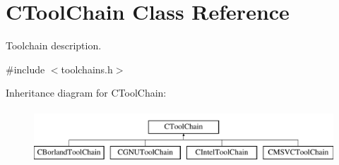 \hypertarget{classCToolChain}{\section{C\-Tool\-Chain Class Reference}
\label{classCToolChain}
}


Toolchain description.  




{\ttfamily \#include $<$toolchains.\-h$>$}

Inheritance diagram for C\-Tool\-Chain\-:\begin{figure}[H]
\begin{center}
\leavevmode
\includegraphics[height=2.000000cm]{da/d5e/classCToolChain}
\end{center}
\end{figure}
